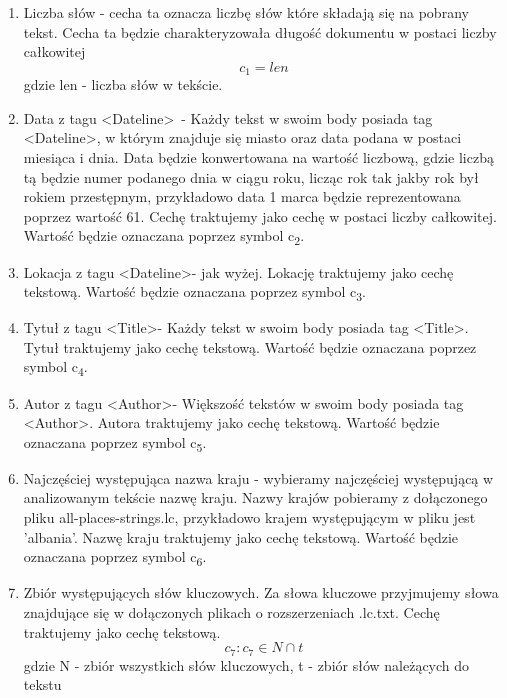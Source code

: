 \documentclass{classrep}
\begin{document}
\begin{enumerate}
  \item Liczba słów - cecha ta oznacza liczbę słów które składają się na pobrany tekst. Cecha ta będzie charakteryzowała długość dokumentu w postaci liczby całkowitej \begin{equation}  c_1 = len \end{equation} gdzie len - liczba słów w tekście.\\
 \item Data z tagu  \textless Dateline\textgreater\ - Każdy tekst w swoim body posiada tag \textless Dateline\textgreater , w którym znajduje się miasto oraz data podana w postaci miesiąca i dnia. Data będzie konwertowana na wartość liczbową, gdzie liczbą tą będzie numer podanego dnia w ciągu roku, licząc rok tak jakby rok był rokiem przestępnym, przykładowo data 1 marca będzie reprezentowana poprzez wartość 61. Cechę traktujemy jako cechę w postaci liczby całkowitej. Wartość będzie oznaczana poprzez symbol  c\textsubscript{2}.    \\
  \item Lokacja z tagu \textless Dateline\textgreater - jak wyżej. Lokację traktujemy jako cechę tekstową. Wartość będzie oznaczana poprzez symbol  c\textsubscript{3}. \\
  \item Tytuł z tagu \textless Title\textgreater - Każdy tekst w swoim body posiada tag \textless Title\textgreater. Tytuł traktujemy jako cechę tekstową. Wartość będzie oznaczana poprzez symbol  c\textsubscript{4}.\\
  \item Autor z tagu \textless Author\textgreater - Większość tekstów w swoim body posiada tag \textless Author\textgreater. Autora traktujemy jako cechę tekstową. Wartość będzie oznaczana poprzez symbol  c\textsubscript{5}.\\
  \item Najczęściej występująca nazwa kraju - wybieramy najczęściej występującą w analizowanym tekście nazwę kraju. Nazwy krajów pobieramy z dołączonego pliku all-places-strings.lc, przykładowo krajem występującym w pliku jest 'albania'. Nazwę kraju traktujemy jako cechę tekstową. Wartość będzie oznaczana poprzez symbol  c\textsubscript{6}.\\
  \item Zbiór występujących słów kluczowych. Za słowa kluczowe przyjmujemy słowa znajdujące się w dołączonych plikach o rozszerzeniach .lc.txt. Cechę traktujemy jako cechę tekstową.  \begin{equation}  c_7 : c_7 \in N \cap t \end{equation} gdzie N - zbiór wszystkich słów kluczowych, t - zbiór słów należących do tekstu\\

\end{enumerate}
\end{document}
